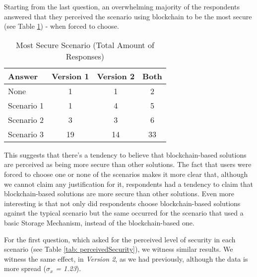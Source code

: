 Starting from the last question, an overwhelming majority of the respondents answered that they perceived the scenario using blockchain to be the most secure (see Table \ref{tab: mostSecure}) - when forced to choose.

\begin{table}[htb]
	\centering
	\caption{Most Secure Scenario (Total Amount of Responses)}
	\label{tab: mostSecure}
	\begin{tabular}{l|c|c|c}
		\hline \bf Answer & \bf Version 1 & \bf Version 2 & \bf Both \\ \hline
		None              & 1             & 1             & 2        \\ \hline
		Scenario 1        & 1             & 4             & 5        \\ \hline
		Scenario 2        & 3             & 3             & 6        \\ \hline
		Scenario 3        & 19            & 14            & 33       \\
		\hline
	\end{tabular}
\end{table}

This suggests that there's a tendency to believe that blockchain-based solutions are perceived as being more secure than other solutions. The fact that users were forced to choose one or none of the scenarios makes it more clear that, although we cannot claim any justification for it, respondents had a tendency to claim that blockchain-based solutions are more secure than other solutions. Even more interesting is that not only did respondents choose blockchain-based solutions against the typical scenario but the same occurred for the scenario that used a basic Storage Mechanism, instead of the blockchain-based one.

For the first question, which asked for the perceived level of security in each scenario (see Table \ref{tab: perceivedSecurity}), we witness similar results. We witness the same effect, in \textit{Version 2}, as we had previously, although the data is more spread (\textit{$\sigma_{x}$ = 1.23}).

